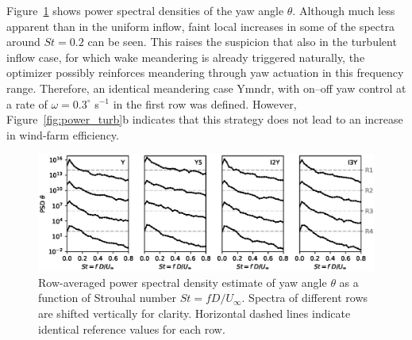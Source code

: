 	Figure~\ref{fig:spec_turbulent} shows power spectral densities of the yaw angle $\theta$. Although much less apparent than in the uniform inflow, faint local increases in some of the spectra around $St = 0.2$ can be seen. This raises the suspicion that also in the turbulent inflow case, for which wake meandering is already triggered naturally, the optimizer possibly reinforces meandering through yaw actuation in this frequency range. Therefore, an identical meandering case Ymndr, with on--off yaw control at a rate of $\omega = 0.3^\circ$ s$^{-1}$ in the first row was defined. However, Figure~\ref{fig:power_turb}b indicates that this strategy does not lead to an increase in wind-farm efficiency. 
	\begin{figure}
		\includegraphics[width=\textwidth]{chapters/optimal_yaw_control/PSD_turbulent.eps}
		\caption[Row-averaged power spectral density estimate of yaw angle $\theta$ as a function of Strouhal number $St = f D/U_\infty$.]{Row-averaged power spectral density estimate of yaw angle $\theta$ as a function of Strouhal number $St = f D/U_\infty$. Spectra of different rows are shifted vertically for clarity. Horizontal dashed lines indicate identical reference values for each row.\label{fig:spec_turbulent}}
	\end{figure}
	
